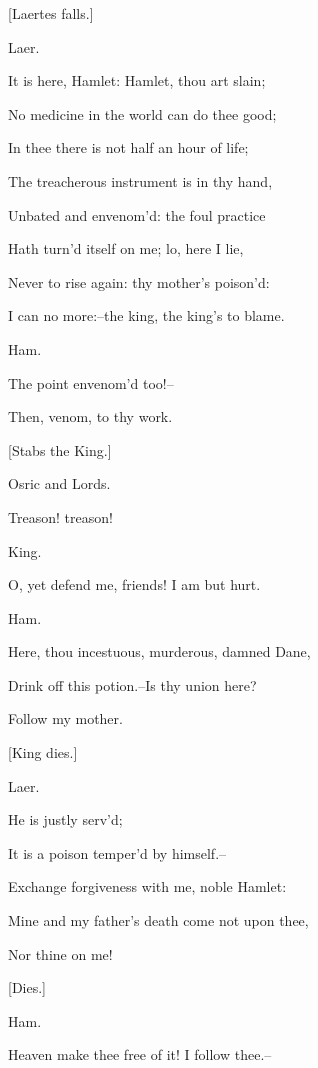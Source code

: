 \documentclass[12pt]{book}
\begin{document}
[Laertes falls.]



Laer.

It is here, Hamlet: Hamlet, thou art slain;

No medicine in the world can do thee good;

In thee there is not half an hour of life;

The treacherous instrument is in thy hand,

Unbated and envenom'd: the foul practice

Hath turn'd itself on me; lo, here I lie,

Never to rise again: thy mother's poison'd:

I can no more:--the king, the king's to blame.



Ham.

The point envenom'd too!--

Then, venom, to thy work.



[Stabs the King.]



Osric and Lords.

Treason! treason!



King.

O, yet defend me, friends! I am but hurt.



Ham.

Here, thou incestuous, murderous, damned Dane,

Drink off this potion.--Is thy union here?

Follow my mother.



[King dies.]



Laer.

He is justly serv'd;

It is a poison temper'd by himself.--

Exchange forgiveness with me, noble Hamlet:

Mine and my father's death come not upon thee,

Nor thine on me!



[Dies.]



Ham.

Heaven make thee free of it! I follow thee.--
\end{document}

